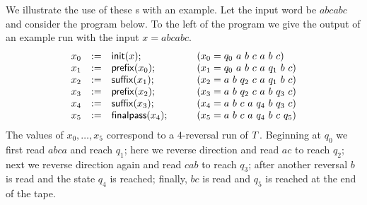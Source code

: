 We illustrate the use of these \FT{}s with an example.  Let the input word be
$a b c a b c$
and consider the program below.
%
To the left of the program we give the output of an example run with the input
$x = a b c a b c$.
%
\[
    \begin{array}{rcll}
        x_0 &:=& \mathsf{init}(x);
            & \qquad (x_0 = q_0\ a\ b\ c\ a\ b\ c) \\
        x_1 &:=& \mathsf{prefix}(x_0);
            & \qquad (x_1 = q_0\ a\ b\ c\ a\ q_1\ b\ c) \\
        x_2 &:=& \mathsf{suffix}(x_1);
            & \qquad (x_2 = a\ b\ q_2\ c\ a\ q_1\ b\ c) \\
        x_3 &:=& \mathsf{prefix}(x_2);
            & \qquad (x_3 = a\ b\ q_2\ c\ a\ b\ q_3\ c) \\
        x_4 &:=& \mathsf{suffix}(x_3);
            & \qquad (x_4 = a\ b\ c\ a\ q_4\ b\ q_3\ c) \\
        x_5 &:=& \mathsf{finalpass}(x_4);
            & \qquad (x_5 = a\ b\ c\ a\ q_4\ b\ c\ q_5) \\
    \end{array}
\]
%
The values of
$x_0, \ldots, x_5$
correspond to a $4$-reversal run of $T$.
%
Beginning at $q_0$ we first read $abca$ and reach $q_1$; here we reverse
direction and read $ac$ to reach $q_2$; next we reverse direction again and
read $c a b$ to reach $q_3$; after another reversal $b$ is read and the state
$q_4$ is reached; finally, $bc$ is read and $q_5$ is reached at the end of the
tape.

